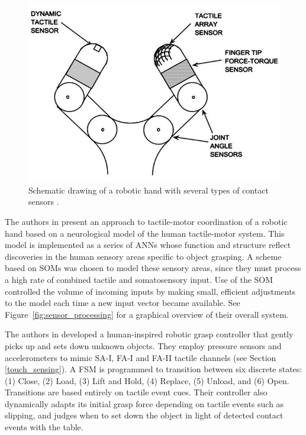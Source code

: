 \begin{figure}[hbt]
	\centering
	\includegraphics[width=\linewidth]{images/touch_sensors}
	\caption{Schematic drawing of a robotic hand with several types of contact sensors \cite{howe1993tactile}.}
	\label{fig:touch_sensors}
\end{figure}

The authors in \cite{leoni1998implementing} present an approach to tactile-motor coordination of a robotic hand based on a neurological model of the human tactile-motor system.
This model is implemented as a series of ANNs whose function and structure reflect discoveries in the human sensory areas specific to object grasping.
A scheme based on SOMs was chosen to model these sensory areas, since they must process a high rate of combined tactile and somatosensory input.
Use of the SOM controlled the volume of incoming inputs by making small, efficient adjustments to the model each time a new input vector became available.
See Figure~\ref{fig:sensor_processing} for a graphical overview of their overall system.

The authors in \cite{romano2011human} developed a human-inspired robotic grasp controller that gently picks up and sets down unknown objects.
They employ pressure sensors and accelerometers to mimic SA-I, FA-I and FA-II tactile channels (see Section \ref{touch_sensing}).
A FSM is programmed to transition between six discrete states: (1) Close, (2) Load, (3) Lift and Hold, (4) Replace, (5) Unload, and (6) Open.
Transitions are based entirely on tactile event cues.
Their controller also dynamically adapts its initial grasp force depending on tactile events such as slipping, and judges when to set down the object in light of detected contact events with the table.

